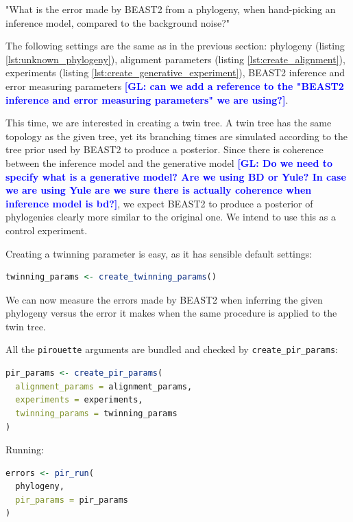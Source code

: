 \documentclass{article}
\newcommand{\giovanni}[1]{\textcolor{blue}{\textbf{[GL: #1]}}}
\begin{document}
"What is the error made by BEAST2 from a phylogeny, 
when hand-picking an inference model, compared to the background noise?"

The following settings are the same as in the previous section:
phylogeny (listing \ref{lst:unknown_phylogeny}), 
alignment parameters (listing \ref{lst:create_alignment}), 
experiments (listing \ref{lst:create_generative_experiment}),
BEAST2 inference and error measuring parameters \giovanni{can we add a reference to the "BEAST2 inference and error measuring parameters" we are using?}.

This time, we are interested in creating a twin tree. A twin tree
has the same topology as the given tree, 
yet its branching times are simulated according 
to the tree prior used by BEAST2 to produce a posterior. 
Since there is coherence between the inference model and the generative model \giovanni{Do we need to specify what is a generative model? Are we using BD or Yule? In case we are using Yule are we sure there is actually coherence when inference model is bd?}, we expect BEAST2 to produce a posterior of phylogenies clearly more similar to the original one. 
We intend to use this as a control experiment.

Creating a twinning parameter is easy, as it has sensible default settings:

\begin{lstlisting}[language=R, floatplacement=H, frame=single]
twinning_params <- create_twinning_params()
\end{lstlisting}

We can now measure the errors made by BEAST2 when inferring the given phylogeny versus the error it makes when the same procedure is applied to the twin tree.

All the \verb;pirouette; arguments are bundled and checked by \verb;create_pir_params;:

\begin{lstlisting}[language=R, floatplacement=H, frame=single]
pir_params <- create_pir_params(
  alignment_params = alignment_params,
  experiments = experiments,
  twinning_params = twinning_params
)
\end{lstlisting}

Running:

\begin{lstlisting}[language=R, floatplacement=H, frame=single]
errors <- pir_run(
  phylogeny,
  pir_params = pir_params
)
\end{lstlisting}
\end{document}

